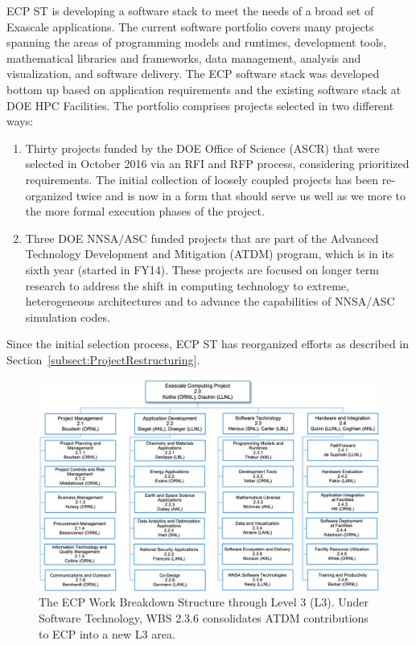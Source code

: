 ECP ST is developing a software stack to meet the needs of a broad set of Exascale applications. The current software portfolio covers many projects spanning the areas of programming models and runtimes, development tools, mathematical libraries and frameworks, data management, analysis and visualization, and software delivery. The ECP software stack was developed bottom up based on application requirements and the existing software stack at DOE HPC Facilities. The portfolio comprises projects selected in two different ways: 
\begin{enumerate}
\item Thirty projects funded by the DOE Office of Science (ASCR) that were selected in October 2016 via an RFI and RFP process, considering prioritized requirements. The initial collection of loosely coupled projects has been re-organized twice and is now in a form that should serve us well as we more to the more formal execution phases of the project.
\item Three DOE NNSA/ASC funded projects that are part of the Advanced Technology Development and Mitigation (ATDM) program, which is in its sixth year (started in FY14). These projects are focused on longer term research to address the shift in computing technology to extreme, heterogeneous architectures and to advance the capabilities of NNSA/ASC simulation codes. 
\end{enumerate}
Since the initial selection process, ECP ST has reorganized efforts as described in Section~\ref{subsect:ProjectRestructuring}.

\begin{figure}
	\centering
	\includegraphics[width=0.9\linewidth]{ECP21}
	\caption{The ECP Work Breakdown Structure through Level 3 (L3). Under Software Technology, WBS 2.3.6 consolidates ATDM contributions to ECP into a new L3 area.}
	\label{fig:ecp2}
\end{figure}

